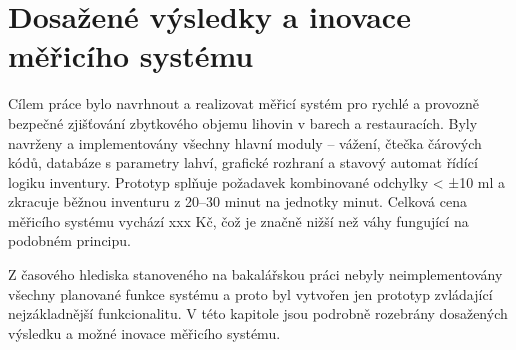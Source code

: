 


%
%

\chapter{Dosažené výsledky a inovace měřicího systému}

 Cílem práce bylo navrhnout a realizovat měřicí systém pro rychlé a provozně bezpečné zjišťování zbytkového objemu lihovin v barech a restauracích. Byly navrženy a implementovány všechny hlavní moduly – vážení, čtečka čárových kódů, databáze s parametry lahví, grafické rozhraní a stavový automat řídící logiku inventury.  Prototyp splňuje požadavek kombinované odchylky < ±10 ml a zkracuje běžnou inventuru z 20–30 minut na jednotky minut. Celková cena měřicího systému vychází xxx Kč, čož je značně nižší než váhy fungující na podobném principu.

Z časového hlediska stanoveného na bakalářskou práci nebyly neimplementovány všechny planované funkce systému a proto byl vytvořen jen prototyp zvládající nejzákladnější funkcionalitu. V této kapitole jsou podrobně rozebrány dosažených výsledku a možné inovace měřicího systému.

%
%
